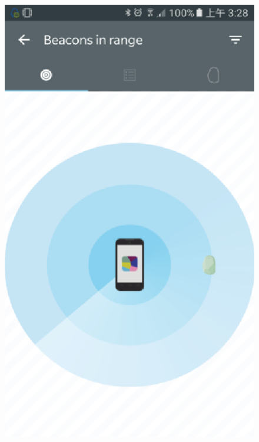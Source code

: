 \documentclass[12pt]{report}
\begin{document}
\begin{figure}[!t]
{\begin{minipage}[htb]{0.35\textwidth}
			\includegraphics[width = \textwidth]{pictures/3_4b.eps}
		\end{minipage}
	}
	\\
\end{figure}
\end{document}
